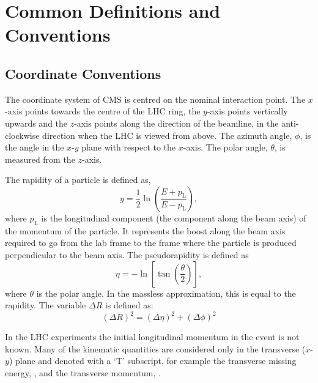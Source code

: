 \chapter{Common Definitions and Conventions}

\section{Coordinate Conventions}
The coordinate system of CMS is centred on the nominal interaction point. The
$x$-axis points towards the centre of the LHC ring, the $y$-axis points vertically
upwards and the $z$-axis points along the direction of the beamline, in the
anti-clockwise direction when the LHC is viewed from above. 
The azimuth angle, $\phi$, is the angle in the $x$-$y$ plane with respect to the
$x$-axis.  The polar angle, $\theta$, is measured from the $z$-axis.

The rapidity of a particle is defined as,
\begin{equation}
    y = \frac{1}{2} \ln \left(\frac{E+p_\text{L}}{E-p_\text{L}}\right),
\label{eq:rapidity}
\end{equation}
where $p_{L}$ is the longitudinal component (the component along the beam axis)
of the momentum of the particle. It represents the boost along the beam axis
required to go from the lab frame to the frame where the particle is produced
perpendicular to the beam axis.
The pseudorapidity is defined as 
\begin{equation}
    \eta = -\ln\left[\tan\left(\frac{\theta}{2}\right)\right], 
\label{eq:pseudorapidity}
\end{equation}
where $\theta$ is the polar angle.  In the massless approximation, this is equal
to the rapidity.
The variable $\Delta R$ is defined as: 
\begin{equation}
  (\Delta R)^{2} = (\Delta \eta)^{2} + (\Delta \phi)^{2} 
  \label{eq:dR}
\end{equation}

In the LHC experiments the initial longitudinal momentum in the event is not
known. Many of the kinematic quantities are considered only in the transverse
($x$-$y$) plane and denoted with a `T' subscript, for example the transverse
missing energy, \ETm, and the transverse momentum, \pT.

